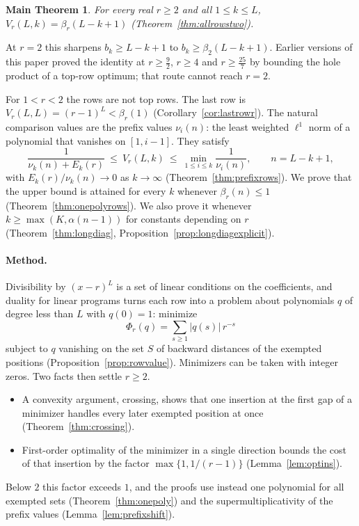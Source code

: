 \documentclass[11pt]{article}
\newtheorem*{mainthm}{Main Theorem}
\begin{document}
\begin{mainthm}
For every real $r\ge2$ and all $1\le k\le L$,
$V_r(L,k)=\beta_r(L-k+1)$ (Theorem~\ref{thm:allrowstwo}).
\end{mainthm}

At $r=2$ this sharpens $b_k\ge L-k+1$ to $b_k\ge\beta_2(L-k+1)$.  Earlier
versions of this paper proved the identity at $r\ge\frac92$, $r\ge4$ and
$r\ge\frac{25}7$ by bounding the hole product of a top-row optimum; that
route cannot reach $r=2$.

For $1<r<2$ the rows are not top rows.  The last row is
$V_r(L,L)=(r-1)^L<\beta_r(1)$ (Corollary~\ref{cor:lastrowr}).  The natural
comparison values are the prefix values $\nu_i(n)$: the least weighted
$\ell^1$ norm of a polynomial that vanishes on $[1,i-1]$.  They satisfy
\[
  \frac1{\nu_k(n)+E_k(r)}\ \le\ V_r(L,k)\ \le\ \min_{1\le i\le k}\frac1{\nu_i(n)},
  \qquad n=L-k+1,
\]
with $E_k(r)/\nu_k(n)\to0$ as $k\to\infty$ (Theorem~\ref{thm:prefixrows}).
We prove that the upper bound is attained for
every $k$ whenever $\beta_r(n)\le1$ (Theorem~\ref{thm:onepolyrows}).  We
also prove it whenever $k\ge\max(K,\alpha(n-1))$ for constants depending on
$r$ (Theorem~\ref{thm:longdiag}, Proposition~\ref{prop:longdiagexplicit}).

\paragraph{Method.}
Divisibility by $(x-r)^L$ is a set of linear conditions on the
coefficients, and duality for linear programs turns each row into a problem
about polynomials
$q$ of degree less than $L$ with $q(0)=1$: minimize
\[
  \Phi_r(q)=\sum_{s\ge1}|q(s)|\,r^{-s}
\]
subject to $q$ vanishing on the set $S$ of backward distances of the
exempted positions (Proposition~\ref{prop:rowvalue}).  Minimizers can be taken with integer
zeros.  Two facts then settle $r\ge2$.
\begin{itemize}
\item A convexity argument, crossing, shows that one insertion at the
first gap of a minimizer handles every later exempted position at once
(Theorem~\ref{thm:crossing}).
\item First-order optimality of the minimizer in a single direction bounds
the cost of that insertion by the factor $\max\{1,1/(r-1)\}$
(Lemma~\ref{lem:optins}).
\end{itemize}
Below $2$ this factor exceeds $1$, and the proofs use instead one
polynomial for all exempted sets (Theorem~\ref{thm:onepoly}) and the
supermultiplicativity of the prefix values (Lemma~\ref{lem:prefixshift}).
\end{document}
